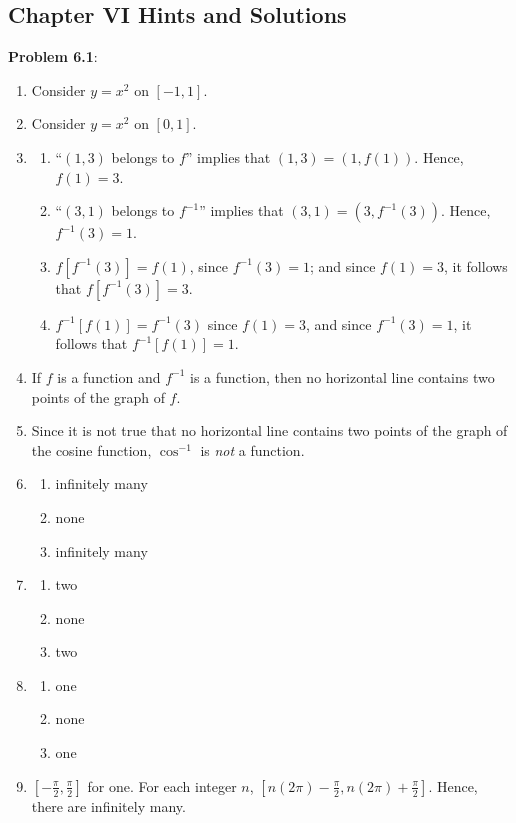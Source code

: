 \documentclass[english]{book}
\begin{document}
\newpage
\begin{center}
\section*{Chapter VI Hints and Solutions}
\end{center}


\textbf{Problem 6.1}:
\begin{enumerate}[\hspace{1cm}1)]
  \item Consider $y = x^{2}$ on $[-1,1]$.
  \item Consider $y = x^{2}$ on $[0,1]$.
  \item 
    \begin{enumerate}[\hspace{1cm}a)]
      \item ``$(1,3)$ belongs to $f$'' implies that $(1,3) = (1,f(1))$. Hence, $f(1)= 3$.
      \item ``$(3,1)$ belongs to $f^{-1}$'' implies that $(3,1) = (3,f^{-1}(3))$. Hence, $f^{-1}(3) = 1$.
      \item $f[f^{-1}(3)] = f(1)$, since $f^{-1}(3)=1$; and since $f(1) = 3$, it follows that $f[f^{-1}(3)] = 3$.
      \item $f^{-1}[f(1)] = f^{-1}(3)$ since $f(1) = 3$, and since $f^{-1}(3) = 1$, it follows that $f^{-1}[f(1)] = 1$.
    \end{enumerate}
  \item If $f$ is a function and $f^{-1}$ is a function, then no horizontal line contains two points of the graph of $f$.
  \item Since it is not true that no horizontal line contains two points of the graph of the cosine function, $\cos^{-1}$ is \emph{not} a function.
  \item
    \begin{enumerate}[\hspace{1cm}a)]
      \item infinitely many
      \item none
      \item infinitely many
    \end{enumerate}
  \item
    \begin{enumerate}[\hspace{1cm}a)]
      \item two
      \item none
      \item two
    \end{enumerate}
  \item
    \begin{enumerate}[\hspace{1cm}a)]
      \item one
      \item none
      \item one
    \end{enumerate}
  \item $[-\frac{\pi}{2}, \frac{\pi}{2}]$ for one. For each integer $n$, $[n(2\pi)-\frac{\pi}{2}, n(2\pi)+\frac{\pi}{2}]$. Hence, there are infinitely many.
\end{enumerate}
\end{document}
